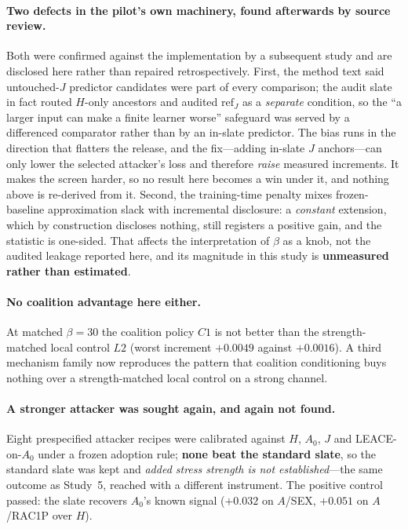 \documentclass[10pt]{article}
\begin{document}
\paragraph{Two defects in the pilot's own machinery, found afterwards by source review.} Both were confirmed
against the implementation by a subsequent study and are disclosed here rather than repaired retrospectively.
First, the method text said untouched-$J$ predictor candidates were part of every comparison; the audit slate
in fact routed $H$-only ancestors and audited $\mathrm{ref}_J$ as a \emph{separate} condition, so the
``a larger input can make a finite learner worse'' safeguard was served by a differenced comparator rather
than by an in-slate predictor. The bias runs in the direction that flatters the release, and the fix---adding
in-slate $J$ anchors---can only lower the selected attacker's loss and therefore \emph{raise} measured
increments. It makes the screen harder, so no result here becomes a win under it, and nothing above is
re-derived from it. Second, the training-time penalty mixes frozen-baseline approximation slack with
incremental disclosure: a \emph{constant} extension, which by construction discloses nothing, still registers
a positive gain, and the statistic is one-sided. That affects the interpretation of $\beta$ as a knob, not the
audited leakage reported here, and its magnitude in this study is \textbf{unmeasured rather than estimated}.

\paragraph{No coalition advantage here either.} At matched $\beta=30$ the coalition policy $C1$ is not better
than the strength-matched local control $L2$ (worst increment $+0.0049$ against $+0.0016$). A third mechanism
family now reproduces the pattern that coalition conditioning buys nothing over a strength-matched local
control on a strong channel.

\paragraph{A stronger attacker was sought again, and again not found.} Eight prespecified attacker recipes
were calibrated against $H$, $A_0$, $J$ and LEACE-on-$A_0$ under a frozen adoption rule; \textbf{none beat the
standard slate}, so the standard slate was kept and \emph{added stress strength is not established}---the same
outcome as Study~5, reached with a different instrument. The positive control passed: the slate recovers
$A_0$'s known signal ($+0.032$ on $A$/SEX, $+0.051$ on $A$/RAC1P over $H$).
\end{document}
